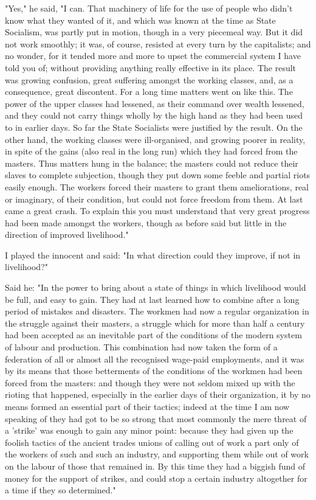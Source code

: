"Yes," he said, "I can. That machinery of life for the use of people who
didn't know what they wanted of it, and which was known at the time as
State Socialism, was partly put in motion, though in a very piecemeal
way. But it did not work smoothly; it was, of course, resisted at every
turn by the capitalists; and no wonder, for it tended more and more to
upset the commercial system I have told you of; without providing
anything really effective in its place. The result was growing
confusion, great suffering amongst the working classes, and, as a
consequence, great discontent. For a long time matters went on like
this. The power of the upper classes had lessened, as their command over
wealth lessened, and they could not carry things wholly by the high hand
as they had been used to in earlier days. So far the State Socialists
were justified by the result. On the other hand, the working classes
were ill-organised, and growing poorer in reality, in spite of the gains
(also real in the long run) which they had forced from the masters. Thus
matters hung in the balance; the masters could not reduce their slaves
to complete subjection, though they put down some feeble and partial
riots easily enough. The workers forced their masters to grant them
ameliorations, real or imaginary, of their condition, but could not
force freedom from them. At last came a great crash. To explain this you
must understand that very great progress had been made amongst the
workers, though as before said but little in the direction of improved
livelihood."

I played the innocent and said: "In what direction could they improve,
if not in livelihood?"

Said he: "In the power to bring about a state of things in which
livelihood would be full, and easy to gain. They had at last learned how
to combine after a long period of mistakes and disasters. The workmen
had now a regular organization in the struggle against their masters, a
struggle which for more than half a century had been accepted as an
inevitable part of the conditions of the modern system of labour and
production. This combination had now taken the form of a federation of
all or almost all the recognised wage-paid employments, and it was by
its means that those betterments of the conditions of the workmen had
been forced from the masters: and though they were not seldom mixed up
with the rioting that happened, especially in the earlier days of their
organization, it by no means formed an essential part of their tactics;
indeed at the time I am now speaking of they had got to be so strong
that most commonly the mere threat of a 'strike' was enough to gain any
minor point: because they had given up the foolish tactics of the
ancient trades unions of calling out of work a part only of the workers
of such and such an industry, and supporting them while out of work on
the labour of those that remained in. By this time they had a biggish
fund of money for the support of strikes, and could stop a certain
industry altogether for a time if they so determined."

